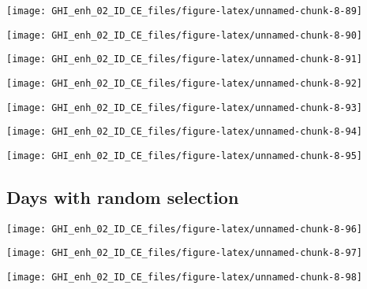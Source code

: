 \documentclass[
  10pt,
  a4paper,oneside]{article}
\begin{document}
\begin{center}\texttt{[image: GHI\_enh\_02\_ID\_CE\_files/figure-latex/unnamed-chunk-8-89]} \end{center}

\begin{center}\texttt{[image: GHI\_enh\_02\_ID\_CE\_files/figure-latex/unnamed-chunk-8-90]} \end{center}

\begin{center}\texttt{[image: GHI\_enh\_02\_ID\_CE\_files/figure-latex/unnamed-chunk-8-91]} \end{center}

\begin{center}\texttt{[image: GHI\_enh\_02\_ID\_CE\_files/figure-latex/unnamed-chunk-8-92]} \end{center}

\begin{center}\texttt{[image: GHI\_enh\_02\_ID\_CE\_files/figure-latex/unnamed-chunk-8-93]} \end{center}

\begin{center}\texttt{[image: GHI\_enh\_02\_ID\_CE\_files/figure-latex/unnamed-chunk-8-94]} \end{center}

\begin{center}\texttt{[image: GHI\_enh\_02\_ID\_CE\_files/figure-latex/unnamed-chunk-8-95]} \end{center}

\FloatBarrier

\hypertarget{days-with-random-selection}{%
\subsection{Days with random selection}\label{days-with-random-selection}}

\begin{center}\texttt{[image: GHI\_enh\_02\_ID\_CE\_files/figure-latex/unnamed-chunk-8-96]} \end{center}

\begin{center}\texttt{[image: GHI\_enh\_02\_ID\_CE\_files/figure-latex/unnamed-chunk-8-97]} \end{center}

\begin{center}\texttt{[image: GHI\_enh\_02\_ID\_CE\_files/figure-latex/unnamed-chunk-8-98]} \end{center}
\end{document}
